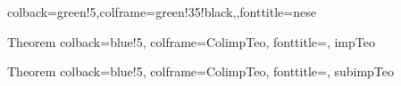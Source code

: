 %
{colback=green!5,colframe=green!35!black,,fonttitle=\bfseries}{nese}

  {Theorem}%
  {%
    colback=blue!5,
    colframe=ColimpTeo,
    fonttitle={},%
  }%
  {impTeo}%

  {Theorem}%
  {%
    colback=blue!5,
    colframe=ColimpTeo,
    fonttitle={},%
  }%
  {subimpTeo}%










